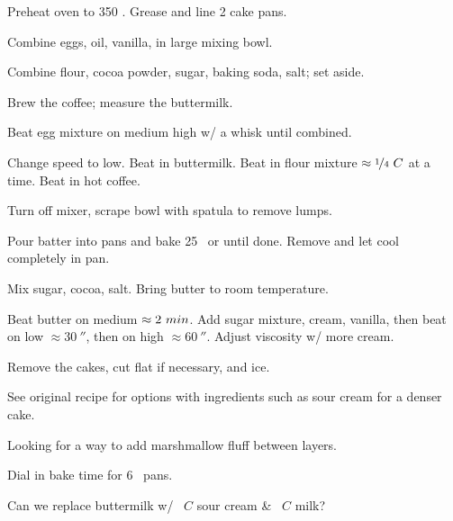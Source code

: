\begin{preparation}
\item Preheat oven to 350 \Fahrenheit.
	Grease and line 2 cake pans.

\item Combine eggs, oil, vanilla, in large mixing bowl.

\item Combine flour, cocoa powder, sugar, baking soda, salt; set aside.

\item Brew the coffee; measure the buttermilk.

\item Beat egg mixture on medium high w/ a whisk until combined.

\item Change speed to low.
	Beat in buttermilk.
	Beat in flour mixture $\approx \onefourth~C$ at a time.
	Beat in hot coffee.

\item Turn off mixer, scrape bowl with spatula to remove lumps.

\item Pour batter into pans and bake 25 \minute~or until done.
	Remove and let cool completely in pan.

\item Mix sugar, cocoa, salt.
	Bring butter to room temperature.

\item Beat butter on medium $\approx2~\minute$.
	Add sugar mixture, cream, vanilla, then beat on low $\approx 30~\second$, then on high $\approx 60~\second$.
	Adjust viscosity w/ more cream.

\item Remove the cakes, cut flat if necessary, and ice.
\end{preparation}


\begin{variation}
\item See original recipe \cite{sallyTripleChoc2020} for options with ingredients such as sour cream for a denser cake.
\end{variation}


\begin{experiments}
\item Looking for a way to add marshmallow fluff between layers.

\item Dial in bake time for 6 \inch~pans.

\item Can we replace buttermilk w/ \threefourth~$C$ sour cream \& \onefourth~$C$ milk?
\end{experiments}


\recipeend

